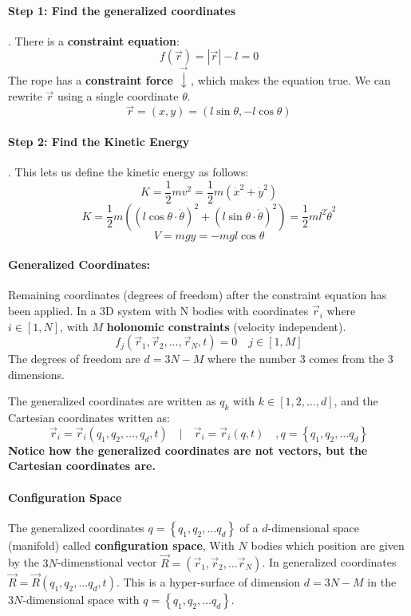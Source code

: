 \paragraph{Step 1: Find the generalized coordinates}
.\newline
There is a \textbf{constraint equation}:
\[
f(\vec{r}) = \left|\vec{r}\right| - l = 0
\]
The rope has a \textbf{constraint force} $\vec{↓}$, which makes the equation true. We can rewrite $\vec{r}$ using a single coordinate $θ$. 
\[
\vec{r}  = (x,y) = (l \sin \theta, -l \cos \theta)
\]
\paragraph{Step 2: Find the Kinetic Energy}
.\newline
This lets us define the kinetic energy as follows:
\[
K = \frac{1}{2}mv^2 = \frac{1}{2}m(\dot{x} ^2 + \dot{y}^2)
\]
\[
K = \frac{1}{2}m \left((l\cos θ ⋅ \dot{θ})^2 + (l\sin θ ⋅ \dot{θ})^2\right) = \frac{1}{2}ml^2 \dot{θ}^2
\]
\[
V = mgy = -mgl \cos θ
\]

\paragraph{Generalized Coordinates:}
Remaining coordinates (degrees of freedom) after the constraint equation has been applied. In a 3D system with N bodies with coordinates $\vec{r}_i$ where $i ∈ [1,N]$, with $M$ \textbf{holonomic constraints} (velocity independent). 
\[
f_j(\vec{r}_1, \vec{r}_2, ..., \vec{r}_N, t) = 0 \quad j ∈ [1,M]
\]
The degrees of freedom are $d = 3N - M$ where the number 3 comes from the 3 dimensions. 

The generalized coordinates are written as $q_k$ with $k ∈ [1,2, \ldots ,d]$, and the Cartesian coordinates written as:
\[
\vec{r}_i = \vec{r}_i(q_1, q_2, \ldots , q_d, t) \quad | \quad \vec{r}_i = \vec{r}_i(q,t) \quad , q = \left\{q_1, q_2, \ldots  q_d\right\}
\]
\textbf{Notice how the generalized coordinates are not vectors, but the Cartesian coordinates are.}

\paragraph{Configuration Space}
The generalized coordinates $q = \left\{q_1, q_2, \ldots  q_d\right\}$ of a $d$-dimensional space (manifold) called \textbf{configuration space}, With $N$ bodies which position are given by the $3N$-dimenstional vector $\vec{R}= (\vec{r}_1, \vec{r}_2, \ldots  \vec{r}_{N})$. In generalized coordinates $\vec{R} = \vec{R}(q_1, q_2, \ldots  q_d, t)$. This is a hyper-surface of dimension $d = 3N - M$ in the $3N$-dimensional space with $q = \left\{q_1, q_2, \ldots  q_d\right\}$.

